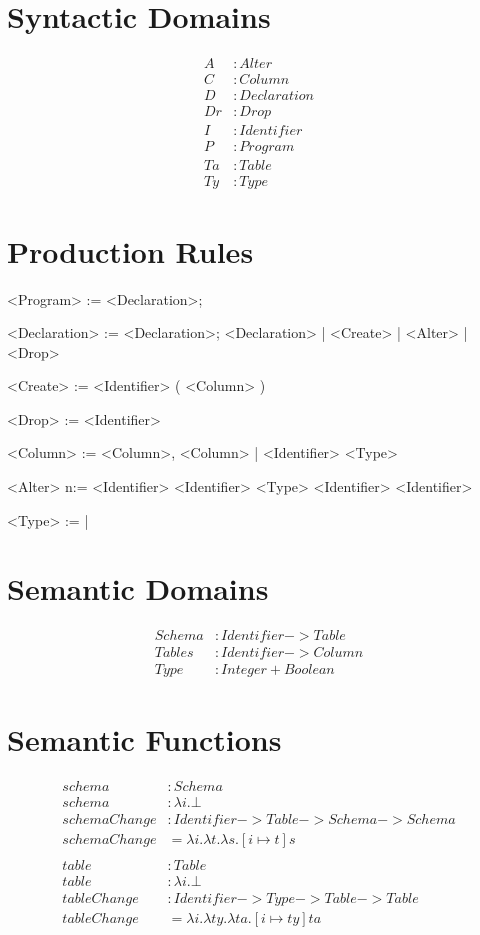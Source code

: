 \documentclass[12pt]{article}
\begin{document}
\section{Syntactic Domains}
\begin{align*}
  A &: Alter \\
  C &: Column \\
  D &: Declaration \\
  Dr &: Drop \\
  I &: Identifier \\
  P &: Program \\
  Ta &: Table \\
  Ty &: Type
\end{align*}

\section{Production Rules}
\begin{grammar}
  <Program> := <Declaration>;

  <Declaration> := <Declaration>; <Declaration> | <Create> | <Alter> | <Drop>

  <Create> :=  <Identifier> ( <Column> )

  <Drop> :=  <Identifier>

  <Column> := <Column>, <Column> | <Identifier> <Type>

  <Alter> n:=  <Identifier>  <Identifier> <Type>
           \alt {} <Identifier>  <Identifier>

  <Type> :=  | 
\end{grammar}

\section{Semantic Domains}
\begin{align*}
  Schema &: Identifier -> Table \\
  Tables &: Identifier -> Column \\
  Type &: Integer + Boolean
\end{align*}

\section{Semantic Functions}
\begin{align*}
  schema &: Schema \\
  schema &: \lambda i.\bot \\
  schemaChange &: Identifier -> Table -> Schema -> Schema \\
  schemaChange &= \lambda i. \lambda t. \lambda s. [ i \mapsto t ]s \\
  \\
  table &: Table \\
  table &: \lambda i.\bot \\
  tableChange &: Identifier -> Type -> Table -> Table \\
  tableChange &= \lambda i. \lambda ty. \lambda ta. [ i \mapsto ty ]ta
\end{align*}
\end{document}
